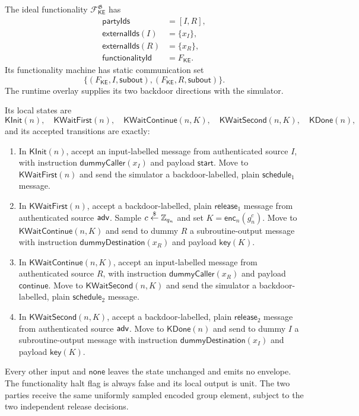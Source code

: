 \begin{definition}
\label{def:dhke-ideal-functionality}
\notready
The ideal functionality \(\mathcal F_{\mathsf{KE}}^{\mathfrak G}\) has
\[
\begin{aligned}
  \mathsf{partyIds}&=[I,R],\\
  \mathsf{externalIds}(I)&=\{x_I\},\\
  \mathsf{externalIds}(R)&=\{x_R\},\\
  \mathsf{functionalityId}&=F_{\mathsf{KE}}.
\end{aligned}
\]
Its functionality machine has static communication set
\[
  \{(F_{\mathsf{KE}},I,\mathsf{subout}),
    (F_{\mathsf{KE}},R,\mathsf{subout})\}.
\]
The runtime overlay supplies its two backdoor directions with the simulator.

Its local states are
\[
  \mathsf{KInit}(n),\quad
  \mathsf{KWaitFirst}(n),\quad
  \mathsf{KWaitContinue}(n,K),\quad
  \mathsf{KWaitSecond}(n,K),\quad
  \mathsf{KDone}(n),
\]
and its accepted transitions are exactly:
\begin{enumerate}
\item In \(\mathsf{KInit}(n)\), accept an input-labelled message from
      authenticated source \(I\), with instruction
      \(\mathsf{dummyCaller}(x_I)\) and payload \(\mathsf{start}\).  Move to
      \(\mathsf{KWaitFirst}(n)\) and send the simulator a backdoor-labelled,
      plain \(\mathsf{schedule}_1\) message.
\item In \(\mathsf{KWaitFirst}(n)\), accept a backdoor-labelled, plain
      \(\mathsf{release}_1\) message from authenticated source \(\mathsf{adv}\).
      Sample \(c\stackrel{\smash{\$}}\gets\mathbb Z_{q_n}\) and set
      \(K=\mathsf{enc}_n(g_n^c)\).  Move to
      \(\mathsf{KWaitContinue}(n,K)\) and send to dummy \(R\) a
      subroutine-output message with instruction
      \(\mathsf{dummyDestination}(x_R)\) and payload \(\mathsf{key}(K)\).
\item In \(\mathsf{KWaitContinue}(n,K)\), accept an input-labelled message
      from authenticated source \(R\), with instruction
      \(\mathsf{dummyCaller}(x_R)\) and payload \(\mathsf{continue}\).  Move
      to \(\mathsf{KWaitSecond}(n,K)\) and send the simulator a
      backdoor-labelled, plain \(\mathsf{schedule}_2\) message.
\item In \(\mathsf{KWaitSecond}(n,K)\), accept a backdoor-labelled, plain
      \(\mathsf{release}_2\) message from authenticated source \(\mathsf{adv}\).
      Move to \(\mathsf{KDone}(n)\) and send to dummy \(I\) a
      subroutine-output message with instruction
      \(\mathsf{dummyDestination}(x_I)\) and payload \(\mathsf{key}(K)\).
\end{enumerate}
Every other input and \(\mathsf{none}\) leaves the state unchanged and emits no
envelope.  The functionality halt flag is always false and its local output is
unit.  The two parties receive the same uniformly sampled encoded group
element, subject to the two independent release decisions.
\end{definition}

